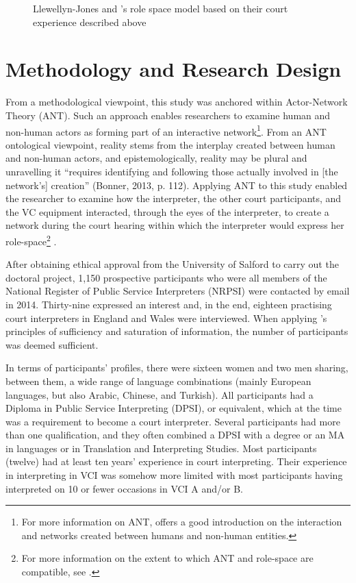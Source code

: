 \documentclass[output=paper]{langsci/langscibook}
\begin{document}
  
 

\begin{figure}
\caption{Llewellyn-Jones and \citet{Lee2014}’s role space model based on their court experience described above}
\end{figure}

\section{Methodology and Research Design}

From a methodological viewpoint, this study was anchored within Actor-Network Theory (ANT). Such an approach enables researchers to examine human and non-human actors as forming part of an interactive network\footnote{For more information on ANT, \citet{Latour2005} offers a good introduction on the interaction and networks created between humans and non-human entities.}. From an ANT ontological viewpoint, reality stems from the interplay created between human and non-human actors, and epistemologically, reality may be plural and unravelling it “requires identifying and following those actually involved in [the network’s] creation” (Bonner, 2013, p. 112). Applying ANT to this study enabled the researcher to examine how the interpreter, the other court participants, and the VC equipment interacted, through the eyes of the interpreter, to create a network during the court hearing within which the interpreter would express her role-space\footnote{For more information on the extent to which ANT and role-space are compatible, see \citet{Devaux2017b}.} . 

After obtaining ethical approval from the University of Salford to carry out the doctoral project, 1,150 prospective participants who were all members of the National Register of Public Service Interpreters (NRPSI) were contacted by email in 2014. Thirty-nine expressed an interest and, in the end, eighteen practising court interpreters in England and Wales were interviewed. When applying \citet{Seidman2006}’s principles of sufficiency and saturation of information, the number of participants was deemed sufficient. 

In terms of participants’ profiles, there were sixteen women and two men sharing, between them, a wide range of language combinations (mainly European languages, but also Arabic, Chinese, and Turkish). All participants had a Diploma in Public Service Interpreting (DPSI), or equivalent, which at the time was a requirement to become a court interpreter. Several participants had more than one qualification, and they often combined a DPSI with a degree or an MA in languages or in Translation and Interpreting Studies. Most participants (twelve) had at least ten years’ experience in court interpreting. Their experience in interpreting in VCI was somehow more limited with most participants having interpreted on 10 or fewer occasions in VCI A and/or B.   
\end{document}
